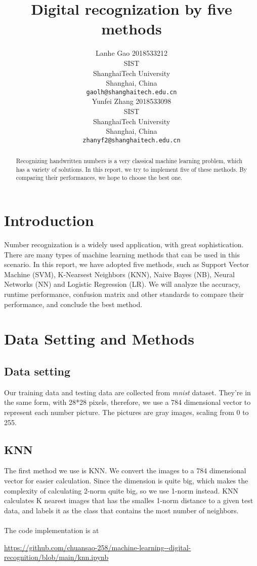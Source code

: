 \documentclass{article}
\title{Digital recognization by five methods}
\author{
	Lanhe Gao 2018533212\\
	SIST\\
	ShanghaiTech University\\
	Shanghai, China \\
	\texttt{gaolh@shanghaitech.edu.cn} \\
	\And
	Yunfei Zhang 2018533098\\
	SIST\\
	ShanghaiTech University\\
	Shanghai, China \\
	\texttt{zhanyf2@shanghaitech.edu.cn} \\
}
\begin{document}
	
	\maketitle
	
	\begin{abstract}
		Recognizing handwritten numbers is a very classical machine learning problem, which has a variety of solutions. In this report, we try to implement five of these methods. By comparing their performances, we hope to choose the best one.
	\end{abstract}

	\section{Introduction}
	
	Number recognization is a widely used application, with great sophistication. There are many types of machine learning methods that can be used in this scenario. In this report, we have adopted five methods, such as Support Vector Machine (SVM), K-Nearsest Neighbors (KNN), Naive Bayes (NB), Neural Networks (NN) and Logistic Regression (LR). We will analyze the accuracy, runtime performance, confusion matrix and other standards to compare their performance, and conclude the best method.
	
	\section{Data Setting and Methods}
	
	\subsection{Data setting}
	
	Our training data and testing data are collected from \textit{mnist} dataset. They're in the same form, with 28*28 pixels, therefore, we use a 784 dimensional vector to represent each number picture. The pictures are gray images, scaling from 0 to 255.
	
	\subsection{KNN}
	
	The first method we use is KNN. We convert the images to a 784 dimensional vector for easier calculation. Since the dimension is quite big, which makes the complexity of calculating 2-norm quite big, so we use 1-norm instead. KNN calculates K nearest images that has the smalles 1-norm distance to a given test data, and labels it as the class that contains the most number of neighbors. \\ \\
	The code implementation is at 
	\begin{center}
		\url{https://github.com/chuansao-258/machine-learning--digital-recognition/blob/main/knn.ipynb}
	\end{center}
	
\end{document}
